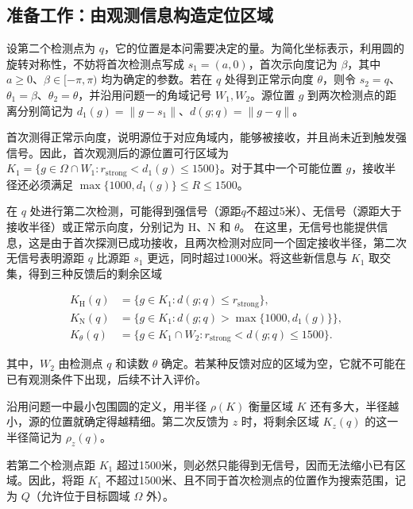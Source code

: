 \documentclass[UTF8,a4paper,zihao=-4,fontset=none]{ctexart}
\begin{document}
\subsection{准备工作：由观测信息构造定位区域}

设第二个检测点为 \(q\)，它的位置是本问需要决定的量。为简化坐标表示，利用圆的旋转对称性，不妨将首次检测点写成 \(s_1=(a,0)\)，首次示向度记为 \(\beta\)，其中 \(a\ge0\)、\(\beta\in[-\pi,\pi)\) 均为确定的参数。若在 \(q\) 处得到正常示向度 \(\theta\)，则令 \(s_2=q\)、\(\theta_1=\beta\)、\(\theta_2=\theta\)，并沿用问题一的角域记号 \(W_1,W_2\)。源位置 \(g\) 到两次检测点的距离分别简记为 \(d_1(g)=\|g-s_1\|\)、\(d(g;q)=\|g-q\|\)。

首次测得正常示向度，说明源位于对应角域内，能够被接收，并且尚未近到触发强信号。因此，首次观测后的源位置可行区域为 \(K_1=\{g\in\Omega\cap W_1:r_{\mathrm{strong}}<d_1(g)\le1500\}\)。对于其中一个可能位置 \(g\)，接收半径还必须满足 \(\max\{1000,d_1(g)\}\le R\le1500\)。

在 \(q\) 处进行第二次检测，可能得到强信号（源距\(q\)不超过5米）、无信号（源距大于接收半径）或正常示向度，分别记为 \(\mathrm H\)、\(\mathrm N\) 和 \(\theta\)。
在这里，无信号也能提供信息，这是由于首次探测已成功接收，且两次检测对应同一个固定接收半径，第二次无信号表明源距 \(q\) 比源距 \(s_1\) 更远，同时超过1000米。将这些新信息与 \(K_1\) 取交集，得到三种反馈后的剩余区域

\begin{equation}
\begin{aligned}
K_{\mathrm H}(q)&=\{g\in K_1:d(g;q)\le r_{\mathrm{strong}}\},\\
K_{\mathrm N}(q)&=\{g\in K_1:d(g;q)>\max\{1000,d_1(g)\}\},\\
K_\theta(q)&=\{g\in K_1\cap W_2:r_{\mathrm{strong}}<d(g;q)\le1500\}.
\end{aligned}
\label{eq:q2-pair-regions}
\end{equation}

其中，\(W_2\) 由检测点 \(q\) 和读数 \(\theta\) 确定。若某种反馈对应的区域为空，它就不可能在已有观测条件下出现，后续不计入评价。

沿用问题一中最小包围圆的定义，用半径 \(\rho(K)\) 衡量区域 \(K\) 还有多大，半径越小，源的位置就确定得越精细。第二次反馈为 \(z\) 时，将剩余区域 \(K_z(q)\) 的这一半径简记为 \(\rho_z(q)\)。

若第二个检测点距 \(K_1\) 超过1500米，则必然只能得到无信号，因而无法缩小已有区域。因此，将距 \(K_1\) 不超过1500米、且不同于首次检测点的位置作为搜索范围，记为 \(Q\)（允许位于目标圆域 \(\Omega\) 外）。
\end{document}
